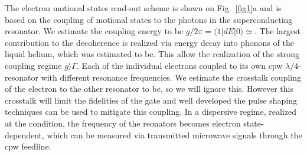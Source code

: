 \documentclass[twocolumn,superscriptaddress,unsortedaddress,
 amsmath,amssymb,
 aps,
]{revtex4-2}
\begin{document}
The electron motional states read-out scheme is shown on Fig.~\ref{fig1}a and is based on the coupling of motional states to the photons in the superconducting resonator. We estimate the coupling energy to be $g/2 \pi = \langle 1 | d E| 0 \rangle \simeq $. The largest contribution to the decoherence is realized via energy decay into phonons of the liquid helium, which was estimated to be. This allow the realization of the strong coupling regime $g \rangle \Gamma$. Each of the individual electrons coupled to its own cpw $\lambda/4$-resonator with different resonance frequencies. We estimate the crosstalk coupling of the electron to the other resonator to be, so we will ignore this. However this crosstalk will limit the fidelities of the gate and well developed the pulse shaping techniques can be used to mitigate this coupling. In a dispersive regime, realized at the condition, the frequency of the reonators becomes electron state-dependent, which can be measured via transmitted microwave signals through the cpw feedline.
\end{document}
